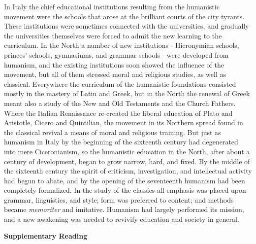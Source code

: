 \documentclass[]{book}
\begin{document}
In Italy the chief educational institutions resulting from the humanistic movement were the schools that arose at the brilliant courts of the city tyrants. These institutions were sometimes connected with the universities, and gradually the universities themselves were forced to admit the new learning to the curriculum. In the North a number of new institutions - Hieronymian schools, princes' schools, gymnasiums, and grammar schools - were developed from humanism, and the existing institutions soon showed the influence of the movement, but all of them stressed moral and religious studies, as well as classical. Everywhere the curriculum of the humanistic foundations consisted mostly in the mastery of Latin and Greek, but in the North the renewal of Greek meant also a study of the New and Old Testaments and the Church Fathers. Where the Italian Renaissance re-created the liberal education of Plato and Aristotle, Cicero and Quintilian, the movement in its Northern spread found in the classical revival a means of moral and religious training. But just as humanism in Italy by the beginning of the sixteenth century had degenerated into mere Ciceronianism, so the humanistic education in the North, after about a century of development, began to grow narrow, hard, and fixed. By the middle of the sixteenth century the spirit of criticism, investigation, and intellectual activity had begun to abate, and by the opening of the seventeenth humanism had been completely formalized. In the study of the classics all emphasis was placed upon grammar, linguistics, and style; form was preferred to content; and methods became \emph{memoriter} and imitative. Humanism had largely performed its mission, and a new awakening was needed to revivify education and society in general.

\textbf{Supplementary Reading}
\end{document}
